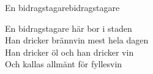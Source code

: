 \begin{song}{En bidragstagare}{bidragstagare}
\begin{vers}
En bidragstagare här bor i staden\\
Han dricker brännvin mest hela dagen\\
Han dricker öl och han dricker vin\\
Och kallas allmänt för fyllesvin\\
\end{vers}
\end{song}

